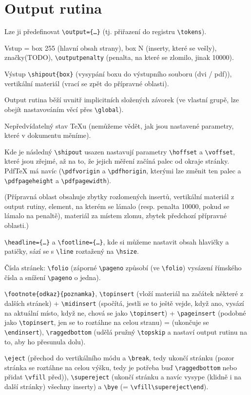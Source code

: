 \documentclass[12pt]{article}					%
\begin{document}
\section{Output rutina}
    Lze ji předefinovat \verb|\output={…}| (tj. přiřazení do registru \verb|\tokens|).

    \begin{definice}
        Vstup = box 255 (hlavní obsah strany), box N (inserty, které se vešly), značky(TODO), \verb|\outputpenalty| (penalta, na které se zlomilo, jinak 10000).

        Výstup \verb|\shipout{box}| (vysypání boxu do výstupního souboru (dvi / pdf)), vertikální materiál (vrací se zpět do přípravné oblasti).

        \begin{upozorneni}
            Output rutina běží uvnitř implicitních složených závorek (ve vlastní grupě, lze obejít nastavováním věcí přes \verb|\global|).

            Nepředvídatelný stav \TeX{}u (nemůžeme vědět, jak jsou nastavené parametry, které v dokumentu měníme).
        \end{upozorneni}

        Kde je následný \verb|\shipout| usazen nastavují parametry \verb|\hoffset| a \verb|\voffset|, které jsou zřejmé, až na to, že jejich měření začíná palec od okraje stránky. PdfTeX má navíc (\verb|\pdfvorigin| a \verb|\pdfhorigin|, kterými lze změnit ten palec a \verb|\pdfpageheight| a \verb|\pdfpagewidth|).
    \end{definice}

    (Přípravná oblast obsahuje zbytky rozlomených insertů, vertikální materiál z output rutiny, element, na kterém se lámalo (resp. penalta 10000, pokud se lámalo na penaltě), materiál za místem zlomu, zbytek předchozí přípravné oblasti.)

    \begin{definice}
        \verb|\headline={…}| a \verb|\footline={…}|, kde si můžeme nastavit obsah hlavičky a patičky, sází se s \verb|\line| roztažený na \verb|\hsize|.

        Čísla stránek: \verb|\folio| (záporné \verb|\pageno| způsobí (ve \verb|\folio|) vysázení římského čísla a snížení \verb|\pageno| o jedna).

        \verb|\footnote{odkaz}{poznamka}|, \verb|\topinsert| (vloží materiál na začátek některé z dalších stránek) + \verb|\midinsert| (spočítá, jestli se to ještě vejde, když ano, vysází na aktuální místo, když ne, chová se jako \verb|\topinsert|) + \verb|\pageinsert| (podobné jako \verb|\topinsert|, jen se to roztáhne na celou stranu) = (ukončuje se \verb|\endinsert|), \verb|\raggedbottom| (udělá pružný \verb|\topskip| a nastaví output rutinu na to, aby ho přesunula dolu).

        \verb|\eject| (přechod do vertikálního módu a \verb|\break|, tedy ukončí stránku (pozor stránka se roztáhne na celou výšku, tedy je potřeba buď \verb|\raggedbottom| nebo přidat \verb|\vfill| před)), \verb|\supereject| (ukončí stránku a navíc vysype (klidně i na další stránky) všechny inserty) a \verb|\bye| (= \verb|\vfill\supereject\end|).
    \end{definice}
\end{document}
